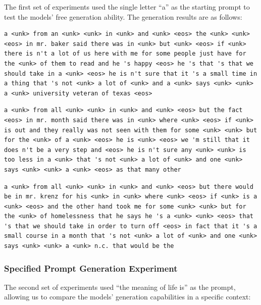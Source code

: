 \documentclass[12pt,oneside]{article}
\begin{document}
The first set of experiments used the single letter ``a'' as the starting prompt to test the models' free generation ability. The generation results are as follows:

\begin{lstlisting}[caption=Transformer Model Generation]
a <unk> from an <unk> <unk> in <unk> and <unk> <eos> the <unk> <unk> <eos> in mr. baker said there was in <unk> but <unk> <eos> if <unk> there is n't a lot of us here with me for some people just have for the <unk> of them to read and he 's happy <eos> he 's that 's that we should take in a <unk> <eos> he is n't sure that it 's a small time in a thing that 's not <unk> a lot of <unk> and a <unk> says <unk> <unk> a <unk> university veteran of texas <eos>
\end{lstlisting}

\begin{lstlisting}[caption=LSTM Model Generation]
a <unk> from all <unk> <unk> in <unk> and <unk> <eos> but the fact <eos> in mr. month said there was in <unk> where <unk> <eos> if <unk> is out and they really was not seen with them for some <unk> <unk> but for the <unk> of a <unk> <eos> he is <unk> <eos> we 'm still that it does n't be a very step and <eos> he is n't sure any <unk> <unk> is too less in a <unk> that 's not <unk> a lot of <unk> and one <unk> says <unk> <unk> a <unk> <eos> as that many other
\end{lstlisting}

\begin{lstlisting}[caption=RNN Model Generation]
a <unk> from all <unk> <unk> in <unk> and <unk> <eos> but there would be in mr. krenz for his <unk> in <unk> where <unk> <eos> if <unk> is a <unk> <eos> and the other hand took me for some <unk> <unk> but for the <unk> of homelessness that he says he 's a <unk> <unk> <eos> that 's that we should take in order to turn off <eos> in fact that it 's a small course in a month that 's not <unk> a lot of <unk> and one <unk> says <unk> <unk> a <unk> n.c. that would be the
\end{lstlisting}

\subsubsection{Specified Prompt Generation Experiment}

The second set of experiments used ``the meaning of life is'' as the prompt, allowing us to compare the models' generation capabilities in a specific context:
\end{document}

